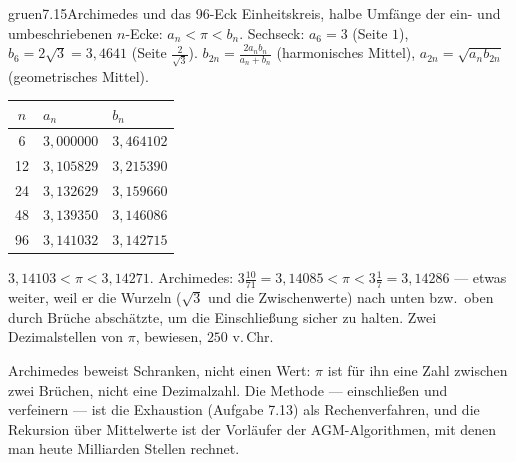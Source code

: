 \begin{loesungkarte}{gruen}{7.15}{Archimedes und das 96-Eck}
Einheitskreis, halbe Umfänge der ein- und umbeschriebenen $n$-Ecke: $a_n < \pi < b_n$. Sechseck: $a_6 = 3$ (Seite $1$), $b_6 = 2\sqrt3 = 3{,}4641$ (Seite $\frac2{\sqrt3}$).
$b_{2n} = \frac{2a_nb_n}{a_n + b_n}$ (harmonisches Mittel), $a_{2n} = \sqrt{a_nb_{2n}}$ (geometrisches Mittel).
\begin{center}\small
\begin{tabular}{c|ll}
$n$ & $a_n$ & $b_n$\\ \hline
6 & $3{,}000000$ & $3{,}464102$\\
12 & $3{,}105829$ & $3{,}215390$\\
24 & $3{,}132629$ & $3{,}159660$\\
48 & $3{,}139350$ & $3{,}146086$\\
96 & $3{,}141032$ & $3{,}142715$
\end{tabular}
\end{center}
$3{,}14103 < \pi < 3{,}14271$. Archimedes: $3\frac{10}{71} = 3{,}14085 < \pi < 3\frac17 = 3{,}14286$ --- etwas weiter, weil er die Wurzeln ($\sqrt3$ und die Zwischenwerte) nach unten bzw.\ oben durch Brüche abschätzte, um die Einschließung sicher zu halten. Zwei Dezimalstellen von $\pi$, bewiesen, $250$ v.\,Chr.
\begin{mitnehmen}\kastentext
Archimedes beweist Schranken, nicht einen Wert: $\pi$ ist für ihn eine Zahl zwischen zwei Brüchen, nicht eine Dezimalzahl. Die Methode --- einschließen und verfeinern --- ist die Exhaustion (Aufgabe 7.13) als Rechenverfahren, und die Rekursion über Mittelwerte ist der Vorläufer der AGM-Algorithmen, mit denen man heute Milliarden Stellen rechnet.
\end{mitnehmen}
\end{loesungkarte}

